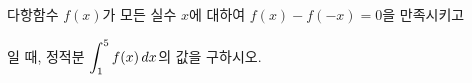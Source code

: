 다항함수 $f(x)$가 모든 실수 $x$에 대하여 $f(x)-f(-x)=0$을 만족시키고\par\smallskip{}\par\smallskip\noindent 일 때, 정적분 $\displaystyle\int_{1}^{5} f(x)\mkern3mu dx$의 값을 구하시오.
